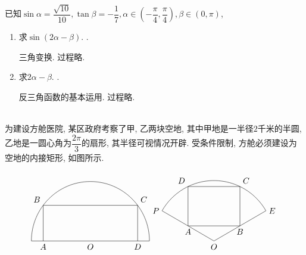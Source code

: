 \documentclass[8pt]{article}
\begin{document}
		已知\(\sin \alpha = \dfrac{\sqrt{10}}{10}, \tan \beta = -\dfrac{1}{7}, \alpha \in \left(-\dfrac{\pi}{4}, \dfrac{\pi}{4}\right), \beta \in (0, \pi)\),

			\begin{enumerate}[label=\defmath{(\arabic*)}]
				\item 求\(\sin (2\alpha - \beta)\). .
					
					三角变换. 过程略.

				\item 求\(2\alpha - \beta\). .

					反三角函数的基本运用. 过程略.
			\end{enumerate}
		~\\

		为建设方舱医院, 某区政府考察了甲, 乙两块空地, 其中甲地是一半径\(2\)千米的半圆, 乙地是一圆心角为\(\dfrac{2\pi}{3}\)的扇形, 其半径可视情况开辟. 受条件限制, 方舱必须建设为空地的内接矩形, 如图所示.

			\[
				\begin{tikzpicture}[scale = 0.5, baseline = 0]
					\draw[black] (-5, 0)--(0, 0)--(5, 0) node at (0, 0)[anchor = north] {\(O\)} node at (-4, 0)[anchor = north] {\(A\)} node at (4, 0)[anchor = north] {\(D\)};
					\draw[black] (5, 0) arc[start angle = 0, end angle = 180, radius = 5];
					\draw[black] (-4, 0)--(-4, 3)--(4, 3)--(4, 0) node at (-4, 3)[anchor = south east] {\(B\)} node at (4, 3)[anchor = south west] {\(C\)};  
				\end{tikzpicture}
				\begin{tikzpicture}[scale = 1.1, baseline = 0]
					\draw[black] (-2, {2 / sqrt(3)})--(0, 0)--(2, {2 / sqrt(3)}) node at (0, 0)[anchor = north] {\(O\)} node at (-1, {1 / sqrt(3)})[anchor = north] {\(A\)} node at (1, {1 / sqrt(3)})[anchor = north] {\(B\)} node at (2, {2 / sqrt(3)})[anchor = west] {\(E\)} node at (-2, {2 / sqrt(3)})[anchor = east] {\(P\)};
					\draw[black] (2, {2 / sqrt(3)}) arc[start angle = 30, end angle = 150, radius = {4 / sqrt(3)}];
					\draw[black] (-1, {1 / sqrt(3)})--(1, {1 / sqrt(3)})--(1, {sqrt(13 / 3)})--(-1, {sqrt(13 / 3)})--(-1, {1 / sqrt(3)}) node at (-1, {sqrt(13 / 3)})[anchor = south east] {\(D\)} node at (1, {sqrt(13 / 3)})[anchor = south west] {\(C\)};
				\end{tikzpicture}
			\]
\end{document}
